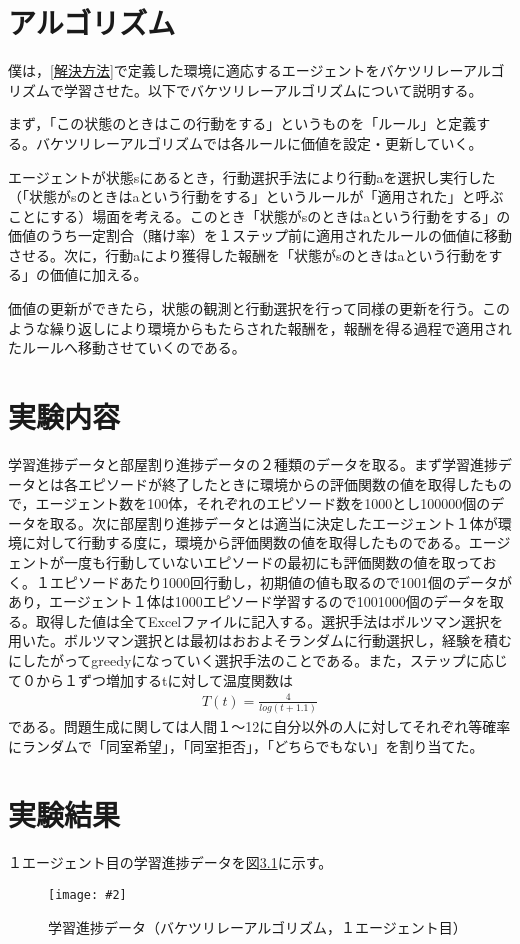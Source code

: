 \documentclass[titlepage]{ltjsreport}
\newcommand{\image}[2]{\begin{figure}[h]\vspace{1em}\begin{center}\texttt{[image: \#2]}\caption{#1}\label{#1}\end{center}\end{figure}}
\begin{document}
\chapter{アルゴリズム}
僕は，\ref{解決方法}で定義した環境に適応するエージェントをバケツリレーアルゴリズムで学習させた。以下でバケツリレーアルゴリズムについて説明する。

まず，「この状態のときはこの行動をする」というものを「ルール」と定義する。バケツリレーアルゴリズムでは各ルールに価値を設定・更新していく。

エージェントが状態sにあるとき，行動選択手法により行動aを選択し実行した（「状態がsのときはaという行動をする」というルールが「適用された」と呼ぶことにする）場面を考える。このとき「状態がsのときはaという行動をする」の価値のうち一定割合（賭け率）を１ステップ前に適用されたルールの価値に移動させる。次に，行動aにより獲得した報酬を「状態がsのときはaという行動をする」の価値に加える。

価値の更新ができたら，状態の観測と行動選択を行って同様の更新を行う。このような繰り返しにより環境からもたらされた報酬を，報酬を得る過程で適用されたルールへ移動させていくのである。
\chapter{実験内容}
学習進捗データと部屋割り進捗データの２種類のデータを取る。まず学習進捗データとは各エピソードが終了したときに環境からの評価関数の値を取得したもので，エージェント数を100体，それぞれのエピソード数を1000とし100000個のデータを取る。次に部屋割り進捗データとは適当に決定したエージェント１体が環境に対して行動する度に，環境から評価関数の値を取得したものである。エージェントが一度も行動していないエピソードの最初にも評価関数の値を取っておく。１エピソードあたり1000回行動し，初期値の値も取るので1001個のデータがあり，エージェント１体は1000エピソード学習するので1001000個のデータを取る。取得した値は全てExcelファイルに記入する。選択手法はボルツマン選択を用いた。ボルツマン選択とは最初はおおよそランダムに行動選択し，経験を積むにしたがってgreedyになっていく選択手法のことである。また，ステップに応じて０から１ずつ増加するtに対して温度関数は
\begin{eqnarray*}
T(t)=\frac{4}{log(t+1.1)}
\end{eqnarray*}
である。問題生成に関しては人間１～12に自分以外の人に対してそれぞれ等確率にランダムで「同室希望」，「同室拒否」，「どちらでもない」を割り当てた。
\chapter{実験結果}
\label{実験結果}
１エージェント目の学習進捗データを図\ref{学習進捗データ（バケツリレーアルゴリズム，１エージェント目）}に示す。
\image{学習進捗データ（バケツリレーアルゴリズム，１エージェント目）}{外部ファイル/学習進捗データ/バケツリレーアルゴリズム/１エージェント目.png}
\end{document}
